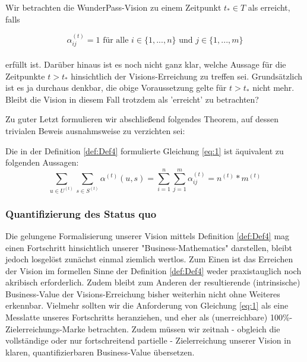 \documentclass[11pt]{scrartcl}
\begin{document}
\begin{Def}\label{def:Def4}

Wir betrachten die WunderPass-Vision zu einem Zeitpunkt $t_{*} \in T$ als erreicht, falls

\vspace{0.3cm}

\begin{equation}
\label{eq:1}
  \alpha^{(t)}_{ij} = 1 \textrm{ für alle } i \in \{1,...,n\} \textrm{ und } j \in \{1,...,m\}
\end{equation}\\
erfüllt ist. Darüber hinaus ist es noch nicht ganz klar, welche Aussage für die Zeitpunkte $t > t_{*}$ hinsichtlich der Visions-Erreichung zu treffen sei. Grundsätzlich ist es ja durchaus denkbar, die obige Voraussetzung gelte für $t > t_{*}$ nicht mehr. Bleibt die Vision in diesem Fall trotzdem als 'erreicht' zu betrachten?

\end{Def}

\vspace{1cm}

Zu guter Letzt formulieren wir abschließend folgendes Theorem, auf dessen trivialen Beweis ausnahmsweise zu verzichten sei:

\vspace{0.3cm}

\begin{Theorem}
Die in der Definition \ref{def:Def4} formulierte Gleichung \eqref{eq:1} ist äquivalent zu folgenden Aussagen: 
\begin{equation*}
  \sum_{u \in U^{(t)}} \sum_{s \in S^{(t)}} \alpha^{(t)}(u, s) = \sum_{i=1}^n \sum_{j=1}^m \alpha^{(t)}_{ij} = n^{(t)} * m^{(t)}
\end{equation*}
\end{Theorem}

\subsubsection{Quantifizierung des Status quo}
\label{sec:eco_zahlen_status_quo}
Die gelungene Formalisierung unserer Vision mittels Definition \ref{def:Def4} mag einen Fortschritt hinsichtlich unserer "Business-Mathematics" darstellen, bleibt jedoch losgelöst zunächst einmal ziemlich wertlos. Zum Einen ist das Erreichen der Vision im formellen Sinne der Definition \ref{def:Def4} weder praxistauglich noch akribisch erforderlich. Zudem bleibt zum Anderen der resultierende (intrinsische) Business-Value der Visions-Erreichung bisher weiterhin nicht ohne Weiteres erkennbar.
Vielmehr sollten wir die Anforderung von Gleichung \eqref{eq:1} als eine Messlatte unseres Fortschritts heranziehen, und eher als (unerreichbare) 100\%-Zielerreichungs-Marke betrachten. Zudem müssen wir zeitnah - obgleich die vollständige oder nur fortschreitend partielle - Zielerreichung unserer Vision in klaren, quantifizierbaren Business-Value übersetzen.
\end{document}
